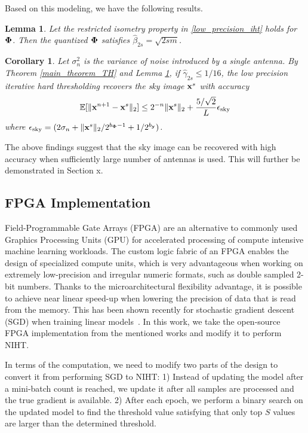 \documentclass{article}
\newtheorem{lemma}{Lemma}
\newtheorem{corollary}{Corollary}
\begin{document}
Based on this modeling, we have the following results.

\begin{lemma}\label{beta_for_ra}
    Let the restricted isometry property in \ref{low_precision_iht} holds for ${\bf \Phi}$. Then the quantized ${\bf \Phi}$ satisfies $\hat{\beta}_{2s} = \sqrt{2sm}$.
\end{lemma}

\begin{corollary}
Let $\sigma_n^2$ is the variance of noise introduced by a single antenna. By Theorem \ref{main_theorem_TH} and Lemma \ref{beta_for_ra}, if $\hat{\gamma}_{2s}\leq 1/16$, the low precision iterative hard thresholding recovers the sky image ${\bf x}^s$ with accuracy
\begin{equation}
    \mathbb{E}[\|{\bf x}^{n+1} - {\bf x}^s \|_2] \leq 2^{-n}\| {\bf x}^s\|_2 + \frac{5/\sqrt{2}}{L} \epsilon_{\rm{sky}}
\end{equation}
where $\epsilon_{\rm{sky}} = (2\sigma_n + \|{\bf x}^s \|_2/2^{b_{\bf \Phi}-1} + 1/2^{b_{\bf y}})$.
\end{corollary}
The above findings suggest that the sky image can be recovered with high accuracy when sufficiently large number of antennas is used. This will further be demonstrated in Section x.


\subsection{FPGA Implementation}
Field-Programmable Gate Arrays (FPGA) are an alternative to commonly used Graphics Processing Units (GPU) for accelerated processing of compute intensive machine learning workloads. The custom logic fabric of an FPGA enables the design of specialized compute units, which is very advantageous when working on extremely low-precision and irregular numeric formats, such as double sampled 2-bit numbers. Thanks to the microarchitectural flexibility advantage, it is possible to achieve near linear speed-up when lowering the precision of data that is read from the memory. This has been shown recently for stochastic gradient descent (SGD) when training linear models~\cite{zhang2017zipml, kara2017fpga}. In this work, we take the open-source FPGA implementation from the mentioned works and modify it to perform NIHT.

In terms of the computation, we need to modify two parts of the design to convert it from performing SGD to NIHT: 1) Instead of updating the model after a mini-batch count is reached, we update it after all samples are processed and the true gradient is available. 2) After each epoch, we perform a binary search on the updated model to find the threshold value satisfying that only top $S$ values are larger than the determined threshold.
\end{document}
